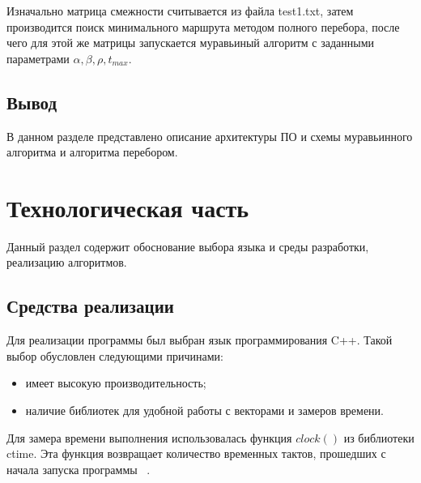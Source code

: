 \documentclass[a4paper,oneside,14pt]{extreport}
\begin{document}
Изначально матрица смежности считывается из файла test1.txt, затем производится поиск минимального маршрута методом полного перебора, после чего для этой же матрицы запускается муравьиный алгоритм с заданными параметрами $\alpha, \beta, \rho, t_{max}$.

\section*{Вывод}
В данном разделе представлено описание архитектуры ПО и схемы муравьинного алгоритма и алгоритма перебором.

\chapter{Технологическая часть}
Данный раздел содержит обоснование выбора языка и среды разработки, реализацию алгоритмов.

\section{Средства реализации}
Для реализации программы был выбран язык программирования C++. Такой выбор обусловлен следующими причинами:
\begin{itemize}
	\item имеет высокую производительность;
	\item наличие библиотек для удобной работы с векторами и замеров времени.
\end{itemize}

Для замера времени выполнения использовалась функция $clock()$ из библиотеки ctime. Эта функция возвращает количество временных тактов, прошедших с начала запуска программы ~\cite{cpp}. 
\end{document}
